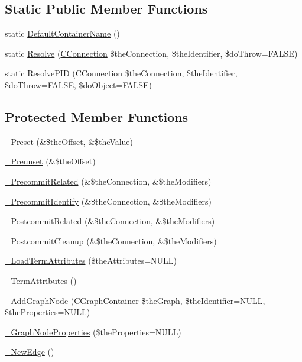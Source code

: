 \subsection*{Static Public Member Functions}
\begin{DoxyCompactItemize}
\item 
static \hyperlink{class_c_ontology_node_a66c5bc42f0cbb921105795127fa816cf}{Default\-Container\-Name} ()
\item 
static \hyperlink{class_c_ontology_node_af249fcb695d7d3ceeed5a74446df0822}{Resolve} (\hyperlink{class_c_connection}{C\-Connection} \$the\-Connection, \$the\-Identifier, \$do\-Throw=F\-A\-L\-S\-E)
\item 
static \hyperlink{class_c_ontology_node_aa29329d76906e4d2a5f5589a909074a1}{Resolve\-P\-I\-D} (\hyperlink{class_c_connection}{C\-Connection} \$the\-Connection, \$the\-Identifier, \$do\-Throw=F\-A\-L\-S\-E, \$do\-Object=F\-A\-L\-S\-E)
\end{DoxyCompactItemize}
\subsection*{Protected Member Functions}
\begin{DoxyCompactItemize}
\item 
\hyperlink{class_c_ontology_node_a75c282c323e10fed112e14488d5962c5}{\-\_\-\-Preset} (\&\$the\-Offset, \&\$the\-Value)
\item 
\hyperlink{class_c_ontology_node_a93662baceebafc3d02904083aaab7c29}{\-\_\-\-Preunset} (\&\$the\-Offset)
\item 
\hyperlink{class_c_ontology_node_acc47d27e9a861190b00a6efb39f7c825}{\-\_\-\-Precommit\-Related} (\&\$the\-Connection, \&\$the\-Modifiers)
\item 
\hyperlink{class_c_ontology_node_aca703ceb64a2175b2b432bf50874015a}{\-\_\-\-Precommit\-Identify} (\&\$the\-Connection, \&\$the\-Modifiers)
\item 
\hyperlink{class_c_ontology_node_a2a86e54a0b6336b3014eb3dc0f41a103}{\-\_\-\-Postcommit\-Related} (\&\$the\-Connection, \&\$the\-Modifiers)
\item 
\hyperlink{class_c_ontology_node_afee8b58f970fe3ff8bc07ef80c771558}{\-\_\-\-Postcommit\-Cleanup} (\&\$the\-Connection, \&\$the\-Modifiers)
\item 
\hyperlink{class_c_ontology_node_a140f5db26f804f0347f09b3959ed75da}{\-\_\-\-Load\-Term\-Attributes} (\$the\-Attributes=N\-U\-L\-L)
\item 
\hyperlink{class_c_ontology_node_a0dd83a16ead60eba2e6782f1dfab2f72}{\-\_\-\-Term\-Attributes} ()
\item 
\hyperlink{class_c_ontology_node_aa91367053433a0bdd052650f9eb54a7c}{\-\_\-\-Add\-Graph\-Node} (\hyperlink{class_c_graph_container}{C\-Graph\-Container} \$the\-Graph, \$the\-Identifier=N\-U\-L\-L, \$the\-Properties=N\-U\-L\-L)
\item 
\hyperlink{class_c_ontology_node_a1b13e21b3b634b6fd66d5dce38a79b9a}{\-\_\-\-Graph\-Node\-Properties} (\$the\-Properties=N\-U\-L\-L)
\item 
\hyperlink{class_c_ontology_node_a1b559f9ace69d7768a7acb8a7364d493}{\-\_\-\-New\-Edge} ()
\end{DoxyCompactItemize}
